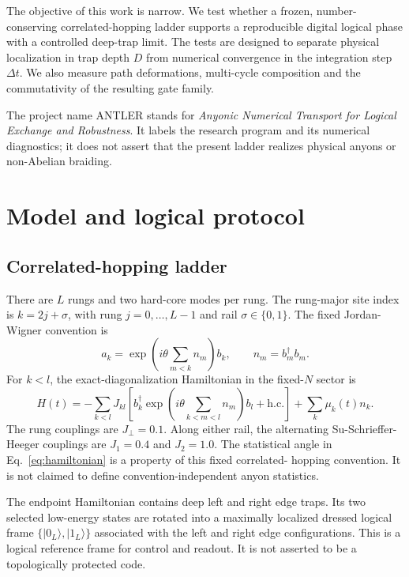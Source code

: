 \documentclass[11pt]{article}
\begin{document}
The objective of this work is narrow. We test whether a frozen,
number-conserving correlated-hopping ladder supports a reproducible digital
logical phase with a controlled deep-trap limit. The tests are designed to
separate physical localization in trap depth $D$ from numerical convergence in
the integration step $\Delta t$. We also measure path deformations,
multi-cycle composition and the commutativity of the resulting gate family.

The project name ANTLER stands for \emph{Anyonic Numerical Transport for
Logical Exchange and Robustness}. It labels the research program and its
numerical diagnostics; it does not assert that the present ladder realizes
physical anyons or non-Abelian braiding.

\section{Model and logical protocol}

\subsection{Correlated-hopping ladder}

There are $L$ rungs and two hard-core modes per rung. The rung-major site
index is $k=2j+\sigma$, with rung $j=0,\ldots,L-1$ and rail
$\sigma\in\{0,1\}$. The fixed Jordan-Wigner convention is
\begin{equation}
 a_k=\exp\!\left(i\theta\sum_{m<k}n_m\right)b_k,
 \qquad n_m=b_m^\dagger b_m .
\end{equation}
For $k<l$, the exact-diagonalization Hamiltonian in the fixed-$N$ sector is
\begin{equation}
 H(t)=-\sum_{k<l}J_{kl}\left[
 b_k^\dagger \exp\!\left(i\theta\sum_{k<m<l}n_m\right)b_l
 +\mathrm{h.c.}\right]+\sum_k\mu_k(t)n_k .
 \label{eq:hamiltonian}
\end{equation}
The rung couplings are $J_\perp=0.1$. Along either rail, the alternating
Su-Schrieffer-Heeger couplings are $J_1=0.4$ and $J_2=1.0$. The statistical
angle in Eq.~\eqref{eq:hamiltonian} is a property of this fixed correlated-
hopping convention. It is not claimed to define convention-independent
anyon statistics.

The endpoint Hamiltonian contains deep left and right edge traps. Its two
selected low-energy states are rotated into a maximally localized dressed
logical frame $\{\lvert 0_L\rangle,\lvert 1_L\rangle\}$ associated with the
left and right edge configurations. This is a logical reference frame for
control and readout. It is not asserted to be a topologically protected code.
\end{document}
